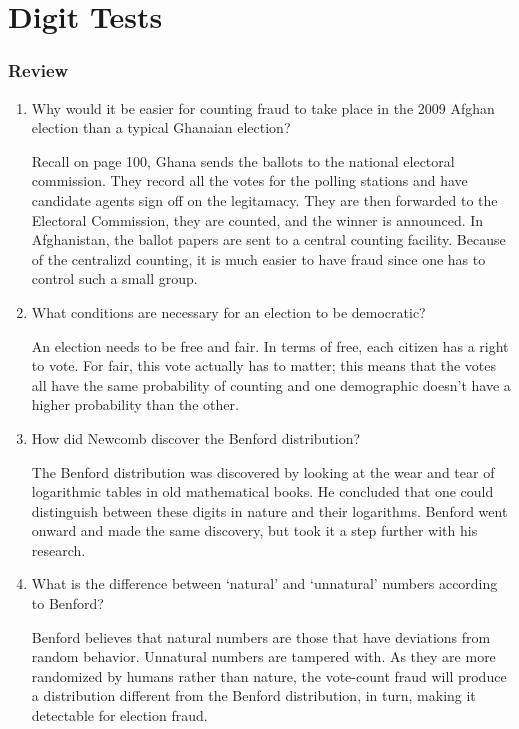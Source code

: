 \chapter{Digit Tests}\label{ch:digitTests}


\subsection*{Review}
\begin{enumerate}

 \item Why would it be easier for counting fraud to take place in the 2009 Afghan election than a typical Ghanaian election?
\begin{solution}
Recall on page 100, Ghana sends the ballots to the national electoral commission. They record all the votes for the polling stations and have candidate agents sign off on the legitamacy. They are then forwarded to the Electoral Commission, they are counted, and the winner is announced. In Afghanistan, the ballot papers are sent to a central counting facility. Because of the centralizd counting, it is much easier to have fraud since one has to control such a small group. 
\end{solution}

 \item What conditions are necessary for an election to be democratic?
\begin{solution}
An election needs to be free and fair. In terms of free, each citizen has a right to vote. For fair, this vote actually has to matter; this means that the votes all have the same probability of counting and one demographic doesn't have a higher probability than the other. 
\end{solution}

 \item How did Newcomb discover the Benford distribution?
\begin{solution}
The Benford distribution was discovered by looking at the wear and tear of logarithmic tables in old mathematical books. He concluded that one could distinguish between these digits in nature and their logarithms. Benford went onward and made the same discovery, but took it a step further with his research. 
\end{solution}

 \item What is the difference between `natural' and `unnatural' numbers according to Benford?
\begin{solution}
Benford believes that natural numbers are those that have deviations from random behavior. Unnatural numbers are tampered with. As they are more randomized by humans rather than nature, the vote-count fraud will produce a distribution different from the Benford distribution, in turn, making it detectable for election fraud. 
\end{solution}


\end{enumerate}
